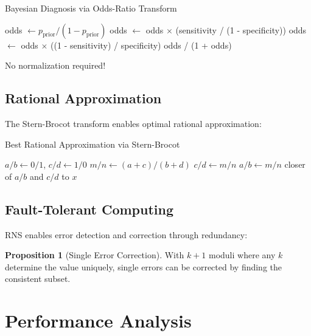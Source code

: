 \documentclass[12pt,a4paper]{article}
\theoremstyle{definition}
\newtheorem{proposition}{Proposition}
\begin{document}
\begin{algorithm}
\caption{Bayesian Diagnosis via Odds-Ratio Transform}
\begin{algorithmic}
\STATE odds $\gets p_{\text{prior}}/(1-p_{\text{prior}})$
    \STATE odds $\gets$ odds $\times$ (sensitivity / (1 - specificity))
  \ELSE
    \STATE odds $\gets$ odds $\times$ ((1 - sensitivity) / specificity)
  \ENDIF
\ENDFOR
\RETURN odds / (1 + odds)
\end{algorithmic}
\end{algorithm}

No normalization required!

\subsection{Rational Approximation}

The Stern-Brocot transform enables optimal rational approximation:

\begin{algorithm}
\caption{Best Rational Approximation via Stern-Brocot}
\begin{algorithmic}
\STATE $a/b \gets 0/1$, $c/d \gets 1/0$
  \STATE $m/n \gets (a+c)/(b+d)$ 
    \STATE $c/d \gets m/n$
  \ELSE
    \STATE $a/b \gets m/n$
  \ENDIF
\ENDWHILE
\RETURN closer of $a/b$ and $c/d$ to $x$
\end{algorithmic}
\end{algorithm}

\subsection{Fault-Tolerant Computing}

RNS enables error detection and correction through redundancy:

\begin{proposition}[Single Error Correction]
With $k+1$ moduli where any $k$ determine the value uniquely, single errors can be corrected by finding the consistent subset.
\end{proposition}

\section{Performance Analysis}
\end{document}
